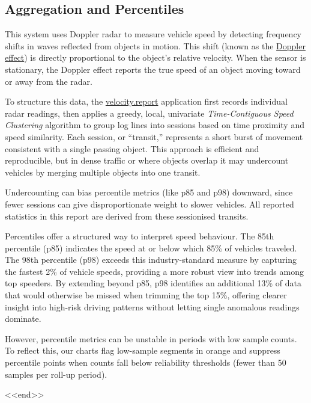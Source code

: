 \subsection*{Aggregation and Percentiles}
This system uses Doppler radar to measure vehicle speed by detecting frequency shifts in waves reflected from objects in motion. This shift (known as the \href{https://en.wikipedia.org/wiki/Doppler_effect}{Doppler effect}) is directly proportional to the object's relative velocity. When the sensor is stationary, the Doppler effect reports the true speed of an object moving toward or away from the radar.
\par
To structure this data, the \href{https://velocity.report}{velocity.report} application first records individual radar readings, then applies a greedy, local, univariate \emph{Time-Contiguous Speed Clustering} algorithm to group log lines into sessions based on time proximity and speed similarity. Each session, or ``transit,'' represents a short burst of movement consistent with a single passing object. This approach is efficient and reproducible, but in dense traffic or where objects overlap it may undercount vehicles by merging multiple objects into one transit.
\par
Undercounting can bias percentile metrics (like p85 and p98) downward, since fewer sessions can give disproportionate weight to slower vehicles. All reported statistics in this report are derived from these sessionised transits.
\par
Percentiles offer a structured way to interpret speed behaviour. The 85th percentile (p85) indicates the speed at or below which 85\% of vehicles traveled. The 98th percentile (p98) exceeds this industry-standard measure by capturing the fastest 2\% of vehicle speeds, providing a more robust view into trends among top speeders. By extending beyond p85, p98 identifies an additional 13\% of data that would otherwise be missed when trimming the top 15\%, offering clearer insight into high-risk driving patterns without letting single anomalous readings dominate.
\par
However, percentile metrics can be unstable in periods with low sample counts. To reflect this, our charts flag low-sample segments in orange and suppress percentile points when counts fall below reliability thresholds (fewer than 50 samples per roll-up period).
\par
<<end>>
